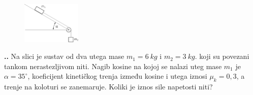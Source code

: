 
\begin{figure} %
    \centering
    \includegraphics[width=0.25\textwidth]{03_Dinamika_materijalne_tocke/zadatak_D702.png}
\end{figure}

\noindent 
\textbf{
\thecjelina.\thezadatak.}
Na slici  je sustav od dva utega mase $m_1=6\ kg$ i $m_2=3\ kg$. koji su povezani tankom nerastezljivom niti. Nagib kosine na kojoj se nalazi uteg mase $m_1$ je $\alpha=35^\circ$, koeficijent kinetičkog trenja između kosine i utega iznosi $\mu_k=0,3$, a trenje na koloturi se zanemaruje. Koliki je iznos sile napetosti niti?

